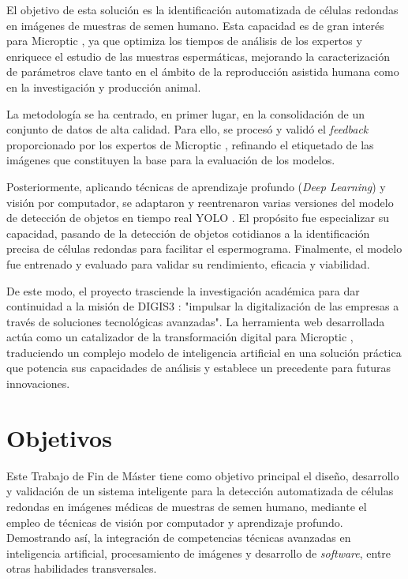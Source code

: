 \documentclass[12pt,a4paper,onecolumn,oneside]{report}
\begin{document}
El objetivo de esta solución es la identificación automatizada de células redondas en imágenes de muestras de semen humano. Esta capacidad es de 
gran interés para Microptic \cite{microptic}, ya que optimiza los tiempos de análisis de los expertos y enriquece el estudio de las muestras espermáticas, 
mejorando la caracterización de parámetros clave tanto en el ámbito de la reproducción asistida humana como en la investigación y producción animal. 

La metodología se ha centrado, en primer lugar, en la consolidación de un conjunto de datos de alta calidad. Para ello, se procesó y validó el \textit{feedback} 
proporcionado por los expertos de Microptic \cite{microptic}, refinando el etiquetado de las imágenes que constituyen la base para la evaluación de los modelos.

Posteriormente, aplicando técnicas de aprendizaje profundo (\textit{Deep Learning}) y visión por computador, se adaptaron y reentrenaron varias versiones 
del modelo de detección de objetos en tiempo real YOLO \cite{ultralytics_models}. El propósito fue especializar su capacidad, pasando de la detección de objetos 
cotidianos a la identificación precisa de células redondas para facilitar el espermograma. Finalmente, el modelo fue entrenado y evaluado 
para validar su rendimiento, eficacia y viabilidad.

De este modo, el proyecto trasciende la investigación académica para dar continuidad a la misión de DIGIS3 \cite{digis3}: "impulsar la digitalización de las empresas a través 
de soluciones tecnológicas avanzadas". La herramienta web desarrollada actúa como un catalizador de la transformación digital para Microptic \cite{microptic}, traduciendo 
un complejo modelo de inteligencia artificial en una solución práctica que potencia sus capacidades de análisis y establece un precedente para futuras innovaciones.

\section{Objetivos}
\label{sec:Objetivos}

Este Trabajo de Fin de Máster tiene como objetivo principal el diseño, desarrollo y validación de un sistema inteligente para la detección automatizada de células redondas en imágenes médicas de muestras de semen humano,
mediante el empleo de técnicas de visión por computador y aprendizaje profundo. 
Demostrando así, la integración de competencias técnicas avanzadas en inteligencia artificial, procesamiento de imágenes y desarrollo de \textit{software}, entre otras habilidades transversales. 
\end{document}
